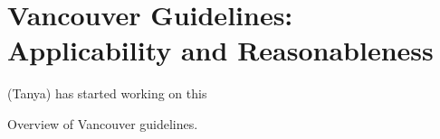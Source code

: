 \section{Vancouver Guidelines: Applicability and Reasonableness}
(Tanya) has started working on this 

Overview of Vancouver guidelines.